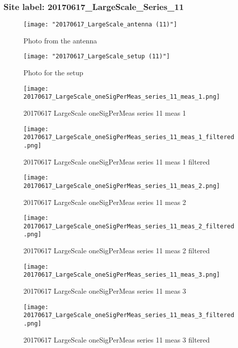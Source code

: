 \subsubsection{Site label: 20170617\_LargeScale\_Series\_11}
\begin{figure}[ht] \caption{Photo from the antenna}
\texttt{[image: "20170617\_LargeScale\_antenna (11)"]}\centering\end{figure}
\begin{figure}[ht] \caption{Photo for the setup}
\texttt{[image: "20170617\_LargeScale\_setup (11)"]}\centering\end{figure}
\begin{figure}[ht] \caption{20170617 LargeScale oneSigPerMeas series 11 meas 1}
\texttt{[image: 20170617\_LargeScale\_oneSigPerMeas\_series\_11\_meas\_1.png]}\centering\end{figure}
\begin{figure}[ht] \caption{20170617 LargeScale oneSigPerMeas series 11 meas 1 filtered}
\texttt{[image: 20170617\_LargeScale\_oneSigPerMeas\_series\_11\_meas\_1\_filtered.png]}\centering\end{figure}
\begin{figure}[ht] \caption{20170617 LargeScale oneSigPerMeas series 11 meas 2}
\texttt{[image: 20170617\_LargeScale\_oneSigPerMeas\_series\_11\_meas\_2.png]}\centering\end{figure}
\begin{figure}[ht] \caption{20170617 LargeScale oneSigPerMeas series 11 meas 2 filtered}
\texttt{[image: 20170617\_LargeScale\_oneSigPerMeas\_series\_11\_meas\_2\_filtered.png]}\centering\end{figure}
\begin{figure}[ht] \caption{20170617 LargeScale oneSigPerMeas series 11 meas 3}
\texttt{[image: 20170617\_LargeScale\_oneSigPerMeas\_series\_11\_meas\_3.png]}\centering\end{figure}
\begin{figure}[ht] \caption{20170617 LargeScale oneSigPerMeas series 11 meas 3 filtered}
\texttt{[image: 20170617\_LargeScale\_oneSigPerMeas\_series\_11\_meas\_3\_filtered.png]}\centering\end{figure}
\clearpage
